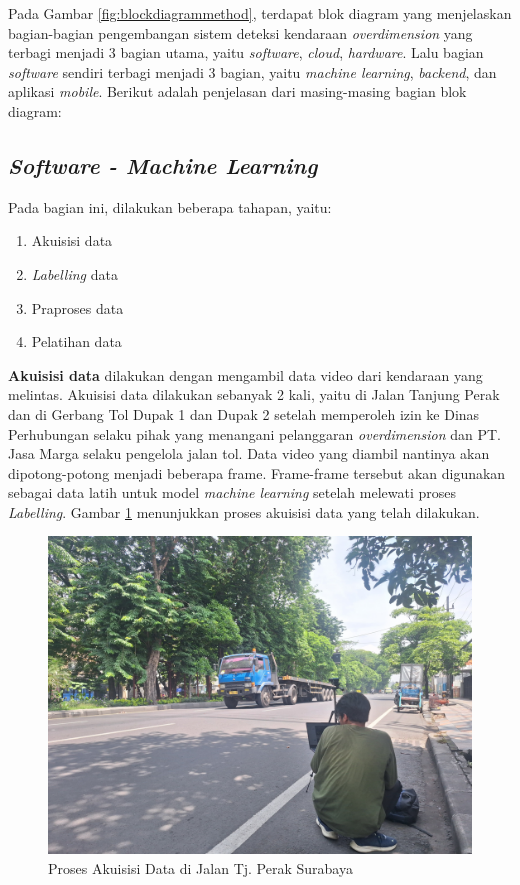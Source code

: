 Pada Gambar \ref{fig:blockdiagrammethod}, terdapat blok diagram yang menjelaskan bagian-bagian pengembangan sistem deteksi kendaraan \emph{overdimension} yang terbagi menjadi 3 bagian utama, yaitu \emph{software}, \emph{cloud}, \emph{hardware}. Lalu bagian \emph{software} sendiri terbagi menjadi 3 bagian, yaitu \emph{machine learning}, \emph{backend}, dan aplikasi \emph{mobile}. Berikut adalah penjelasan dari masing-masing bagian blok diagram:

\subsection{\emph{Software - Machine Learning}}
Pada bagian ini, dilakukan beberapa tahapan, yaitu:
\begin{enumerate}[nolistsep]
  \item Akuisisi data
  \item \emph{Labelling} data
  \item Praproses data
  \item Pelatihan data
\end{enumerate}

\textbf{Akuisisi data} dilakukan dengan mengambil data video dari kendaraan yang melintas. Akuisisi data dilakukan sebanyak 2 kali, yaitu di Jalan Tanjung Perak dan di Gerbang Tol Dupak 1 dan Dupak 2 setelah memperoleh izin ke Dinas Perhubungan selaku pihak yang menangani pelanggaran \emph{overdimension} dan PT. Jasa Marga selaku pengelola jalan tol. Data video yang diambil nantinya akan dipotong-potong menjadi beberapa frame. Frame-frame tersebut akan digunakan sebagai data latih untuk model \emph{machine learning} setelah melewati proses \emph{Labelling}. Gambar \ref{fig:acquisitiondata} menunjukkan proses akuisisi data yang telah dilakukan.

\begin{figure}[htbp]
  \centering

  \includegraphics[scale=0.07]{gambar/bab3-acquisition-data.png}

  \caption{Proses Akuisisi Data di Jalan Tj. Perak Surabaya}
  \label{fig:acquisitiondata}
\end{figure}

